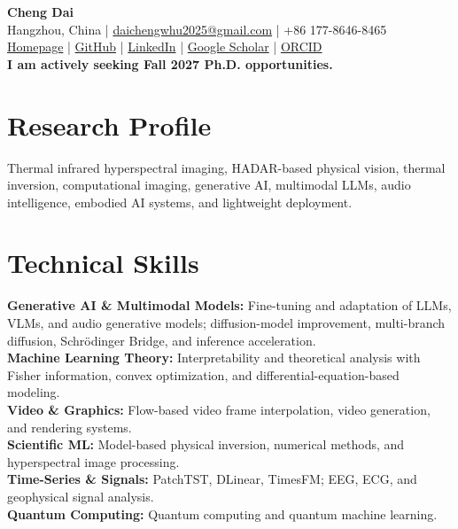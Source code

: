 \documentclass[10pt,letterpaper]{article}
\begin{document}
\fontsize{8.65}{9.65}\selectfont

\begin{center}
  {\Huge\bfseries Cheng Dai}\\[-0.05em]
  Hangzhou, China \;|\; \href{mailto:daichengwhu2025@gmail.com}{daichengwhu2025@gmail.com} \;|\; +86 177-8646-8465\\[-0.05em]
  \href{https://dccc2025.github.io/}{Homepage} \;|\;
  \href{https://github.com/dccc2025}{GitHub} \;|\;
  \href{https://www.linkedin.com/in/cheng-dai-443432403/}{LinkedIn} \;|\;
  \href{https://scholar.google.com/citations?hl=zh-CN\&user=vJrsT54AAAAJ}{Google Scholar} \;|\;
  \href{https://orcid.org/0009-0003-4383-3694}{ORCID}\\[0.25em]
  {\color{accent}\bfseries I am actively seeking Fall 2027 Ph.D. opportunities.}
\end{center}

\vspace{-0.35em}
\section{Research Profile}
Thermal infrared hyperspectral imaging, HADAR-based physical vision, thermal inversion, computational imaging, generative AI, multimodal LLMs, audio intelligence, embodied AI systems, and lightweight deployment.

\section{Technical Skills}
\textbf{Generative AI \& Multimodal Models:} Fine-tuning and adaptation of LLMs, VLMs, and audio generative models; diffusion-model improvement, multi-branch diffusion, Schr\"odinger Bridge, and inference acceleration.\\
\textbf{Machine Learning Theory:} Interpretability and theoretical analysis with Fisher information, convex optimization, and differential-equation-based modeling.\\
\textbf{Video \& Graphics:} Flow-based video frame interpolation, video generation, and rendering systems.\\
\textbf{Scientific ML:} Model-based physical inversion, numerical methods, and hyperspectral image processing.\\
\textbf{Time-Series \& Signals:} PatchTST, DLinear, TimesFM; EEG, ECG, and geophysical signal analysis.\\
\textbf{Quantum Computing:} Quantum computing and quantum machine learning.
\end{document}
